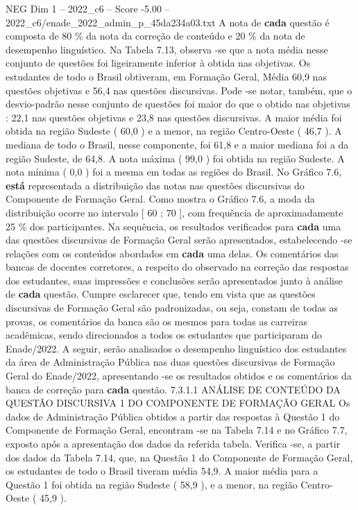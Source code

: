 \begin{textsample}{NEG Dim 1 – 2022\_c6 – Score -5.00 – 2022\_c6/enade\_2022\_admin\_p\_45da234a03.txt}
A nota de \textbf{cada} questão é composta de 80 \% da nota da correção de conteúdo e 20 \% da nota de desempenho linguístico.
Na Tabela 7.13, observa -se que a nota média nesse conjunto de questões foi ligeiramente inferior à obtida nas objetivas.
Os estudantes de todo o Brasil obtiveram, em Formação Geral, Média 60,9 nas questões objetivas e 56,4 nas questões discursivas.
Pode -se notar, também, que o desvio-padrão nesse conjunto de questões foi maior do que o obtido nas objetivas : 22,1 nas questões objetivas e 23,8 nas questões discursivas.
A maior média foi obtida na região Sudeste ( 60,0 ) e a menor, na região Centro-Oeste ( 46,7 ).
A mediana de todo o Brasil, nesse componente, foi 61,8 e a maior mediana foi a da região Sudeste, de 64,8.
A nota máxima ( 99,0 ) foi obtida na região Sudeste.
A nota mínima ( 0,0 ) foi a mesma em todas as regiões do Brasil.
No Gráfico 7.6, \textbf{está} representada a distribuição das notas nas questões discursivas do Componente de Formação Geral.
Como mostra o Gráfico 7.6, a moda da distribuição ocorre no intervalo [ 60 ; 70 ], com frequência de aproximadamente 25 \% dos participantes.
Na sequência, os resultados verificados para \textbf{cada} uma das questões discursivas de Formação Geral serão apresentados, estabelecendo -se relações com os conteúdos abordados em \textbf{cada} uma delas.
Os comentários das bancas de docentes corretores, a respeito do observado na correção das respostas dos estudantes, suas impressões e conclusões serão apresentados junto à análise de \textbf{cada} questão.
Cumpre esclarecer que, tendo em vista que as questões discursivas de Formação Geral são padronizadas, ou seja, constam de todas as provas, os comentários da banca são os mesmos para todas as carreiras acadêmicas, sendo direcionados a todos os estudantes que participaram do Enade/2022.
A seguir, serão analisados o desempenho linguístico dos estudantes da área de Administração Pública nas duas questões discursivas de Formação Geral do Enade/2022, apresentando -se os resultados obtidos e os comentários da banca de correção para \textbf{cada} questão. 7.3.1.1 ANÁLISE DE CONTEÚDO DA QUESTÃO DISCURSIVA 1 DO COMPONENTE DE FORMAÇÃO GERAL Os dados de Administração Pública obtidos a partir das respostas à Questão 1 do Componente de Formação Geral, encontram -se na Tabela 7.14 e no Gráfico 7.7, exposto após a apresentação dos dados da referida tabela.
Verifica -se, a partir dos dados da Tabela 7.14, que, na Questão 1 do Componente de Formação Geral, os estudantes de todo o Brasil tiveram média 54,9.
A maior média para a Questão 1 foi obtida na região Sudeste ( 58,9 ), e a menor, na região Centro-Oeste ( 45,9 ).

\end{textsample}
